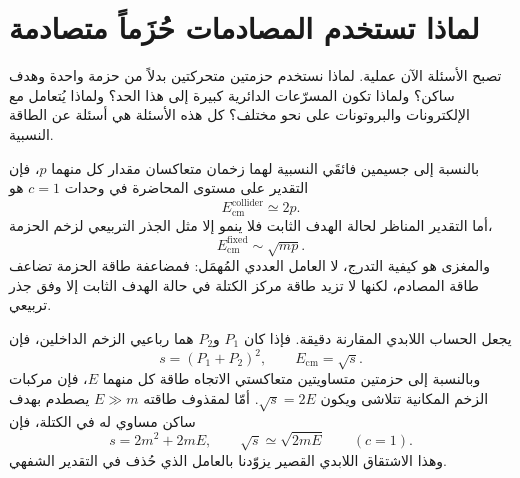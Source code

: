 \section{لماذا تستخدم المصادمات حُزَماً متصادمة}

تصبح الأسئلة الآن عملية. لماذا نستخدم حزمتين متحركتين بدلاً من حزمة واحدة وهدف ساكن؟ ولماذا تكون المسرّعات الدائرية كبيرة إلى هذا الحد؟ ولماذا يُتعامل مع الإلكترونات والبروتونات على نحو مختلف؟ كل هذه الأسئلة هي أسئلة عن الطاقة النسبية.

\begin{classroomqa}\end{classroomqa}

بالنسبة إلى جسيمين فائقَي النسبية لهما زخمان متعاكسان مقدار كل منهما \(p\)، فإن التقدير على مستوى المحاضرة في وحدات \(c=1\) هو \begin{equation}
E_{\mathrm{cm}}^{\mathrm{collider}}\simeq 2p.
\end{equation} أما التقدير المناظر لحالة الهدف الثابت فلا ينمو إلا مثل الجذر التربيعي لزخم الحزمة، \begin{equation}
E_{\mathrm{cm}}^{\mathrm{fixed}}\sim \sqrt{mp}.
\end{equation} والمغزى هو كيفية التدرج، لا العامل العددي المُهمَل: فمضاعفة طاقة الحزمة تضاعف طاقة المصادم، لكنها لا تزيد طاقة مركز الكتلة في حالة الهدف الثابت إلا وفق جذر تربيعي.

يجعل الحساب اللابدي المقارنة دقيقة. فإذا كان \(P_1\) و\(P_2\) هما رباعيي الزخم الداخلين، فإن \begin{equation}
s=(P_1+P_2)^2,
\qquad E_{\mathrm{cm}}=\sqrt{s}.
\end{equation} وبالنسبة إلى حزمتين متساويتين متعاكستي الاتجاه طاقة كل منهما \(E\)، فإن مركبات الزخم المكانية تتلاشى ويكون \(\sqrt{s}=2E\). أمّا لمقذوف طاقته \(E\gg m\) يصطدم بهدف ساكن مساوي له في الكتلة، فإن \begin{equation}
s=2m^2+2mE,
\qquad
\sqrt{s}\simeq \sqrt{2mE}
\qquad (c=1).
\end{equation} وهذا الاشتقاق اللابدي القصير يزوّدنا بالعامل الذي حُذف في التقدير الشفهي.

